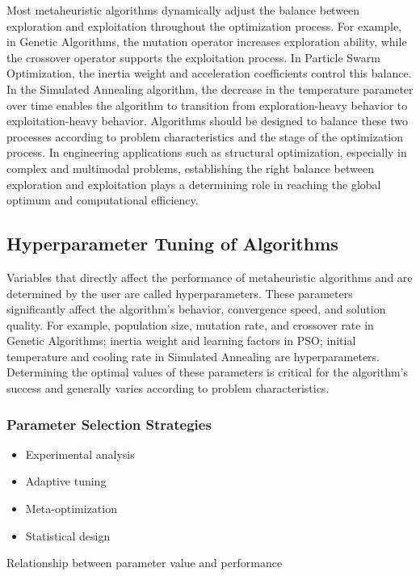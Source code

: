 Most metaheuristic algorithms dynamically adjust the balance between exploration and exploitation throughout the optimization process. For example, in Genetic Algorithms, the mutation operator increases exploration ability, while the crossover operator supports the exploitation process. In Particle Swarm Optimization, the inertia weight and acceleration coefficients control this balance. In the Simulated Annealing algorithm, the decrease in the temperature parameter over time enables the algorithm to transition from exploration-heavy behavior to exploitation-heavy behavior. Algorithms should be designed to balance these two processes according to problem characteristics and the stage of the optimization process. In engineering applications such as structural optimization, especially in complex and multimodal problems, establishing the right balance between exploration and exploitation plays a determining role in reaching the global optimum and computational efficiency.

\subsection{Hyperparameter Tuning of Algorithms}

Variables that directly affect the performance of metaheuristic algorithms and are determined by the user are called hyperparameters. These parameters significantly affect the algorithm's behavior, convergence speed, and solution quality. For example, population size, mutation rate, and crossover rate in Genetic Algorithms; inertia weight and learning factors in PSO; initial temperature and cooling rate in Simulated Annealing are hyperparameters. Determining the optimal values of these parameters is critical for the algorithm's success and generally varies according to problem characteristics.

\subsubsection{Parameter Selection Strategies}
\begin{itemize}
    \item Experimental analysis
    \item Adaptive tuning
    \item Meta-optimization
    \item Statistical design
\end{itemize}

\begin{marginfigure}
\centering
{}
\caption{Relationship between parameter value and performance}
\label{fig:parameter_performance}
\end{marginfigure}

